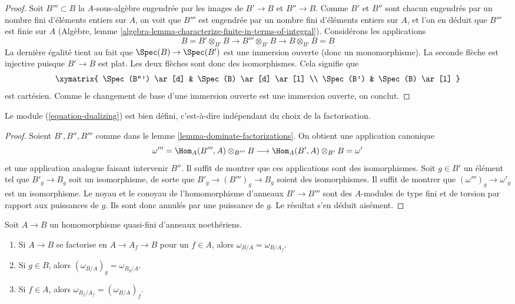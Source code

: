 \begin{proof}
Soit $B''' \subset B$ la $A$-sous-algèbre engendrée par les images
de $B' \to B$ et $B'' \to B$. Comme $B'$ et $B''$ sont chacun engendrés
par un nombre fini d'éléments entiers sur $A$, on voit que $B'''$ est
engendrée par un nombre fini d'éléments entiers sur $A$, et l'on en déduit
que $B'''$ est finie sur $A$
(Algèbre, lemme \ref{algebra-lemma-characterize-finite-in-terms-of-integral}).
Considérons les applications
$$
B = B' \otimes_{B'} B \to B''' \otimes_{B'} B \to B \otimes_{B'} B = B
$$
La dernière égalité tient au fait que $\Spec(B) \to \Spec(B')$ est une
immersion ouverte (donc un monomorphisme). La seconde flèche est injective
puisque $B' \to B$ est plat. Les deux flèches sont donc des isomorphismes.
Cela signifie que
$$
\xymatrix{
\Spec(B''') \ar[d] & \Spec(B) \ar[d] \ar[l] \\
\Spec(B') & \Spec(B) \ar[l]
}
$$
est cartésien. Comme le changement de base d'une immersion ouverte est une
immersion ouverte, on conclut.
\end{proof}

\begin{lemma}
\label{lemma-dualizing-well-defined}
Le module (\ref{equation-dualizing}) est bien défini, c'est-à-dire
indépendant du choix de la factorisation.
\end{lemma}

\begin{proof}
Soient $B', B'', B'''$ comme dans le lemme \ref{lemma-dominate-factorizations}.
On obtient une application canonique
$$
\omega''' = \Hom_A(B''', A) \otimes_{B'''} B \longrightarrow
\Hom_A(B', A) \otimes_{B'} B = \omega'
$$
et une application analogue faisant intervenir $B''$. Il suffit de montrer que ces applications
sont des isomorphismes. Soit $g \in B'$ un élément tel que
$B'_g \to B_g$ soit un isomorphisme, de sorte que $B'_g \to (B''')_g \to B_g$
soient des isomorphismes. Il suffit de montrer que $(\omega''')_g \to \omega'_g$
est un isomorphisme. Le noyau et le conoyau de l'homomorphisme d'anneaux $B' \to B'''$
sont des $A$-modules de type fini et de torsion par rapport aux puissances de $g$.
Ils sont donc annulés par une puissance de $g$.
Le résultat s'en déduit aisément.
\end{proof}

\begin{lemma}
\label{lemma-localize-dualizing}
Soit $A \to B$ un homomorphisme quasi-fini d'anneaux noethériens.
\begin{enumerate}
\item Si $A \to B$ se factorise en $A \to A_f \to B$ pour un $f \in A$,
alors $\omega_{B/A} = \omega_{B/A_f}$.
\item Si $g \in B$, alors $(\omega_{B/A})_g = \omega_{B_g/A}$.
\item Si $f \in A$, alors $\omega_{B_f/A_f} = (\omega_{B/A})_f$.
\end{enumerate}
\end{lemma}

